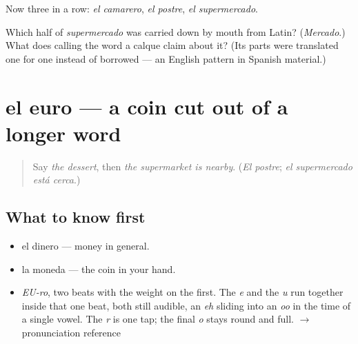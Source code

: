 Now three in a row: \emph{el camarero}, \emph{el postre}, \emph{el supermercado}.

\begin{tcolorbox}[breakable,colback=teal!4,colframe=teal!35!black,title={Before you move on}]
Which half of \emph{supermercado} was carried down by mouth from Latin? (\emph{Mercado}.) What does calling the word a calque claim about it? (Its parts were translated one for one instead of borrowed — an English pattern in Spanish material.)
\end{tcolorbox}
\section[el euro]{el euro — a coin cut out of a longer word}

\label{lesson:ES-C391-euro}



\begin{quote}
Say \emph{the dessert}, then \emph{the supermarket is nearby}. (\emph{El postre}; \emph{el supermercado está cerca}.)
\end{quote}

\subsection*{What to know first}
\begin{itemize}
\raggedright
  \item el dinero — money in general.
  \item la moneda — the coin in your hand.
\end{itemize}

\begin{sounds}
\begin{itemize}
\raggedright
  \item \emph{EU-ro}, two beats with the weight on the first. The \emph{e} and the \emph{u} run together inside that one beat, both still audible, an \emph{eh} sliding into an \emph{oo} in the time of a single vowel. The \emph{r} is one tap; the final \emph{o} stays round and full. $\to$ pronunciation reference
\end{itemize}
\end{sounds}

